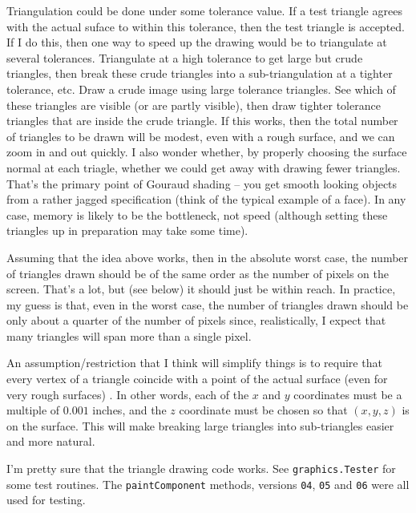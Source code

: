 \documentclass[titlepage,oneside,10pt]{article}
\begin{document}
Triangulation could be done under some tolerance value. If a test
triangle agrees with the actual suface to within this tolerance, then
the test triangle is accepted. If I do this, then one way to speed
up the drawing would be to triangulate at several
tolerances. Triangulate at a high tolerance to get large but crude
triangles, then break these crude triangles into a sub-triangulation
at a tighter tolerance, etc. Draw a crude image using large tolerance
triangles. See which of these triangles are visible (or are partly
visible), then draw tighter tolerance triangles that are inside the
crude triangle. If this works, then the total number of triangles to
be drawn will be modest, even with a rough surface, and we can zoom in
and out quickly. I also wonder whether, by properly choosing the
surface normal at each triagle, whether we could get away with drawing
fewer triangles. That's the primary point of Gouraud shading -- you
get smooth looking objects from a rather jagged specification (think
of the typical example of a face). In any case, memory is likely to be
the bottleneck, not speed (although setting these triangles up in
preparation may take some time). 

Assuming that the idea above works, then in the absolute worst case,
the number of triangles drawn should be of the same order as the
number of pixels on the screen. That's a lot, but (see below) it
should just be within reach. In practice, my guess is that, even in
the worst case, the number of triangles drawn should be only about a
quarter of the number of pixels since, realistically, I expect
that many triangles will span more than a single pixel.

An assumption/restriction that I think will simplify things is to
require that every vertex of a triangle coincide with a point of the
actual surface (even for very rough surfaces) . In other words, each
of the $x$ and $y$ coordinates must be a multiple of $0.001$ inches,
and the $z$ coordinate must be chosen so that $(x,y,z)$ is on the
surface. This will make breaking large triangles into sub-triangles
easier and more natural. 

I'm pretty sure that the triangle drawing code works. See 
{\tt graphics.Tester} for some test routines. The {\tt paintComponent}
methods, versions {\tt 04}, {\tt 05} and {\tt 06} were all used for
testing. 
\end{document}
